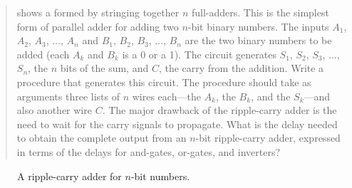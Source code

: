 \begin{quote}
  shows a
 formed by stringing together \( n \) full-adders.
This is the simplest form of parallel adder for adding two \( n \)-bit binary
numbers.  The inputs \( A_1 \), \( A_2 \), \( A_3 \), \( \dots \), \( A_n \) and
\( B_1 \), \( B_2 \), \( B_3 \),
\( \dots \), \( B_n \) are the two binary numbers to be added (each \( A_k \) and
\( B_k \) is a 0 or a 1).  The circuit generates \( S_1 \), \( S_2 \),
\( S_3 \), \( \dots \), \( S_n \),
the \( n \) bits of the sum, and \( C \), the carry from the addition.  Write a
procedure  that generates this circuit.  The procedure
should take as arguments three lists of \( n \) wires each---the \( A_k \), the
\( B_k \), and the \( S_k \)---and also another wire \( C \).  The major drawback of the
ripple-carry adder is the need to wait for the carry signals to propagate.
What is the delay needed to obtain the complete output from an \( n \)-bit
ripple-carry adder, expressed in terms of the delays for and-gates, or-gates,
and inverters?
\end{quote}

\begin{figure}[tb]
\label{Figure 3.27}
\centering
\begin{comment}
\heading{Figure 3.27:} A ripple-carry adder for \( n \)-bit numbers.

\begin{example}
   :                                              :   :
   : A_1 B_1   C_1   A_2 B_2   C_2   A_3 B_3   C_3:   : A_n B_n C_n=0
   :  |   |   +---+   |   |   +---+   |   |   +-----  :  |   |   +-
   |  |   |   |   |   |   |   |   |   |   |   |   :   :  |   |   |
   : ++---+---++  |  ++---+---++  |  ++---+---++  :   : ++---+---++
   : |   FA    |  |  |   FA    |  |  |   FA    |  :   : |   FA    |
   : +--+---+--+  |  +--+---+--+  |  +--+---+--+  :   : +--+---+--+
   :    |   |     |     |   |     |     |   |     :   :    |   |
C ------+   |     +-----+   |     +-----+   |     :  ------+   |
   :        |       C_1     |       C_2     |     :   :C_(n-1) |
   :        |               |               |     :   :        |
           S_1             S_2             S_3                S_n
\end{example}
\end{comment}

\par\bigskip
\noindent
{} A ripple-carry adder for \( n \)-bit numbers.
\end{figure}

